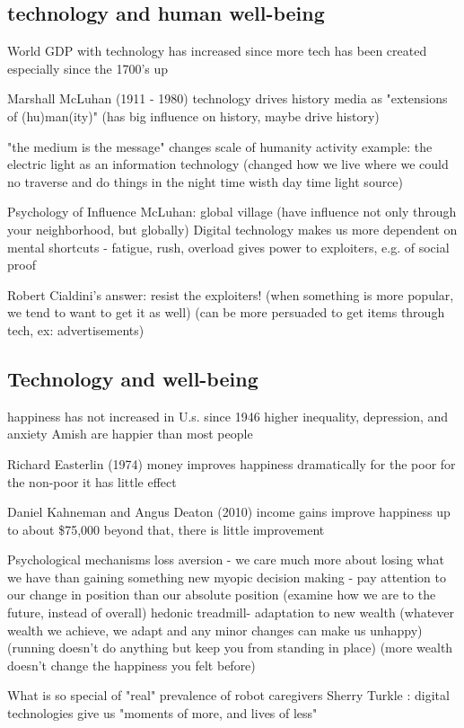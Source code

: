 \documentclass{article}
\begin{document}
\subsection{technology and human well-being}
World GDP with technology has increased since more tech has been created especially since the 1700's up

Marshall McLuhan (1911 - 1980) 
technology drives history media as "extensions of (hu)man(ity)"
(has big influence on history, maybe drive history) 

"the medium is the message" 
changes scale of humanity activity 
example: the electric light as an information technology
(changed how we live where we could no traverse and do things in the night time wisth day time light source) 

Psychology of Influence 
McLuhan: global village (have influence not only through your neighborhood, but globally) 
Digital technology makes us more dependent on mental shortcuts - fatigue, rush, overload
gives power to exploiters, e.g. of social proof

Robert Cialdini's answer: resist the exploiters!
(when something is more popular, we tend to want to get it as well) 
(can be more persuaded to get items through tech, ex: advertisements) 

\subsection{Technology and well-being}
happiness has not increased in U.s. since 1946 
higher inequality, depression, and anxiety
Amish are happier than most people

Richard Easterlin (1974) 
money improves happiness dramatically for the poor 
for the non-poor it has little effect

Daniel Kahneman and Angus Deaton (2010) 
income gains improve happiness up to about \$75,000
beyond that, there is little improvement

Psychological mechanisms
loss aversion - we care much more about losing what we have than gaining something new
myopic decision making - pay attention to our change in position than our absolute position (examine how we are to the future, instead of overall) 
hedonic treadmill- adaptation to new wealth (whatever wealth we achieve, we adapt and any minor changes can make us unhappy) 
(running doesn't do anything but keep you from standing in place) (more wealth doesn't change the happiness you felt before) 

What is so special of "real" 
prevalence of robot caregivers
Sherry Turkle : digital technologies give us "moments of more, and lives of less" 
\end{document}
